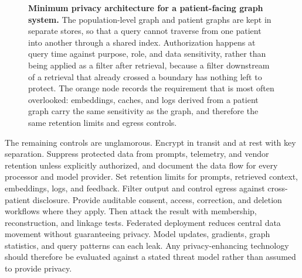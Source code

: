 \documentclass[10pt,a4paper]{article}
\begin{document}
\begin{figure}[!ht]
\centering
{}
\caption{\textbf{Minimum privacy architecture for a patient-facing graph system.} The
population-level graph and patient graphs are kept in separate stores, so that a query cannot
traverse from one patient into another through a shared index. Authorization happens at query time
against purpose, role, and data sensitivity, rather than being applied as a filter after retrieval,
because a filter downstream of a retrieval that already crossed a boundary has nothing left to
protect. The orange node records the requirement that is most often overlooked: embeddings, caches,
and logs derived from a patient graph carry the same sensitivity as the graph, and therefore the same
retention limits and egress controls.}
\label{fig:sprivacy}
\end{figure}

The remaining controls are unglamorous. Encrypt in transit and at rest with key separation. Suppress
protected data from prompts, telemetry, and vendor retention unless explicitly authorized, and
document the data flow for every processor and model provider. Set retention limits for prompts,
retrieved context, embeddings, logs, and feedback. Filter output and control egress against
cross-patient disclosure. Provide auditable consent, access, correction, and deletion workflows where
they apply. Then attack the result with membership, reconstruction, and linkage tests. Federated
deployment reduces central data movement without guaranteeing privacy. Model updates, gradients,
graph statistics, and query patterns can each leak. Any privacy-enhancing technology should therefore
be evaluated against a stated threat model rather than assumed to provide privacy.
\end{document}
